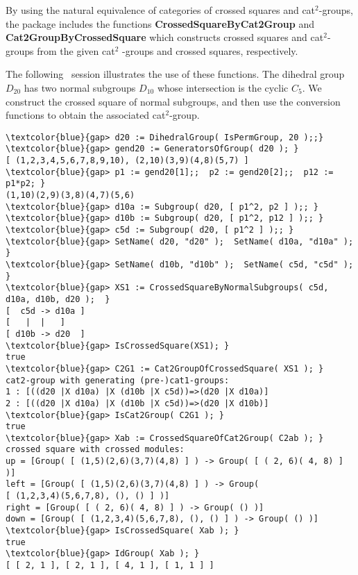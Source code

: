 \documentclass[a4paper,11pt]{article}
\theoremstyle{plain}
\theoremstyle{definition}
\begin{document}
By using the natural equivalence of categories of crossed squares and cat$%
^{2}$-groups, the package includes the functions \textbf{%
	CrossedSquareByCat2Group} and \textbf{Cat2GroupByCrossedSquare} which
constructs crossed squares and cat$^{2}$-groups from the given cat$^{2}$%
-groups and crossed squares, respectively.

The following \GAP\ session illustrates the use of these functions.
The dihedral group $D_{20}$ has two normal subgroups $D_{10}$ 
whose intersection is the cyclic $C_5$.  
We construct the crossed square of normal subgroups, 
and then use the conversion functions to obtain the associated cat$^{2}$-group.

\begin{Verbatim}[frame=single, fontsize=\small, commandchars=\\\{\}]
\textcolor{blue}{gap> d20 := DihedralGroup( IsPermGroup, 20 );;}
\textcolor{blue}{gap> gend20 := GeneratorsOfGroup( d20 ); }
[ (1,2,3,4,5,6,7,8,9,10), (2,10)(3,9)(4,8)(5,7) ]
\textcolor{blue}{gap> p1 := gend20[1];;  p2 := gend20[2];;  p12 := p1*p2; }
(1,10)(2,9)(3,8)(4,7)(5,6)
\textcolor{blue}{gap> d10a := Subgroup( d20, [ p1^2, p2 ] );; }
\textcolor{blue}{gap> d10b := Subgroup( d20, [ p1^2, p12 ] );; }
\textcolor{blue}{gap> c5d := Subgroup( d20, [ p1^2 ] );; }
\textcolor{blue}{gap> SetName( d20, "d20" );  SetName( d10a, "d10a" ); }
\textcolor{blue}{gap> SetName( d10b, "d10b" );  SetName( c5d, "c5d" );  }
\textcolor{blue}{gap> XS1 := CrossedSquareByNormalSubgroups( c5d, d10a, d10b, d20 );  }
[  c5d -> d10a ]
[   |  |   ]
[ d10b -> d20  ]
\textcolor{blue}{gap> IsCrossedSquare(XS1); }
true
\textcolor{blue}{gap> C2G1 := Cat2GroupOfCrossedSquare( XS1 ); }
cat2-group with generating (pre-)cat1-groups:
1 : [((d20 |X d10a) |X (d10b |X c5d))=>(d20 |X d10a)]
2 : [((d20 |X d10a) |X (d10b |X c5d))=>(d20 |X d10b)]
\textcolor{blue}{gap> IsCat2Group( C2G1 ); }
true
\textcolor{blue}{gap> Xab := CrossedSquareOfCat2Group( C2ab ); }
crossed square with crossed modules:
up = [Group( [ (1,5)(2,6)(3,7)(4,8) ] ) -> Group( [ ( 2, 6)( 4, 8) ] )]
left = [Group( [ (1,5)(2,6)(3,7)(4,8) ] ) -> Group(
[ (1,2,3,4)(5,6,7,8), (), () ] )]
right = [Group( [ ( 2, 6)( 4, 8) ] ) -> Group( () )]
down = [Group( [ (1,2,3,4)(5,6,7,8), (), () ] ) -> Group( () )]
\textcolor{blue}{gap> IsCrossedSquare( Xab ); }
true
\textcolor{blue}{gap> IdGroup( Xab ); }
[ [ 2, 1 ], [ 2, 1 ], [ 4, 1 ], [ 1, 1 ] ]
\end{Verbatim}


\end{document}
